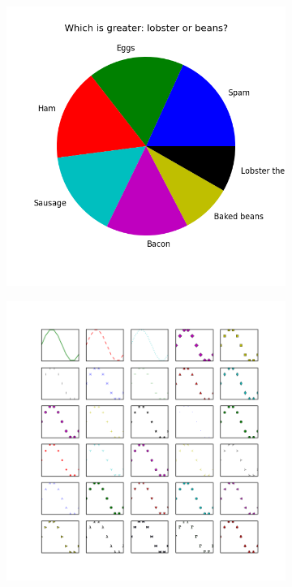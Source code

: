 \begin{figure}
\centering
\begin{subfigure}{.3\textwidth}
\centering
\includegraphics[width=\textwidth]{pie_chart_sorted.png}
\end{subfigure}
\begin{subfigure}{.3\textwidth}
\centering
\includegraphics[width=\textwidth]{multiples.png}

\end{subfigure}
\end{figure}
